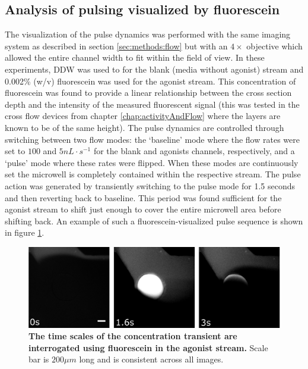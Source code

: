   \subsection{Analysis of pulsing visualized by fluorescein}
  \label{sec:pusling:fluo}
  The visualization of the pulse dynamics was performed with the same imaging system as described in section \ref{sec:methods:flow} but with an \(4\times\) objective which allowed the entire channel width to fit within the field of view. In these experiments, DDW was used to for the blank (media without agonist) stream and 0.002\% (w/v) fluorescein was used for the agonist stream. This concentration of fluorescein was found to provide a linear relationship between the cross section depth and the intensity of the measured fluorescent signal (this was tested in the cross flow devices from chapter \ref{chap:activityAndFlow} where the layers are known to be of the same height). The pulse dynamics are controlled through switching between two flow modes: the `baseline' mode where the flow rates were set to \(100\) and \(5 nL\cdot s^{-1}\) for the blank and agonists channels, respectively, and a `pulse' mode where these rates were flipped. When these modes are continuously set the microwell is completely contained within the respective stream. The pulse action was generated by transiently switching to the pulse mode for 1.5 seconds and then reverting back to baseline. This period was found sufficient for the agonist stream to shift just enough to cover the entire microwell area before shifting back. An example of such a fluorescein-visualized pulse sequence is shown in figure \ref{fig:pulses:pulseSequence}.

  \begin{figure}[h]
       \centering
       \includegraphics[width=15cm]{chapter6/figures/pulseSequence/pulseSequence.jpg}
       \caption[Fluorescence visualization of agonist pulsing]{\textbf{The time scales of the concentration transient are interrogated using fluorescein in the agonist stream.} Scale bar is \(200\mu m\) long and is consistent across all images.}
       \label{fig:pulses:pulseSequence}
  \end{figure}


